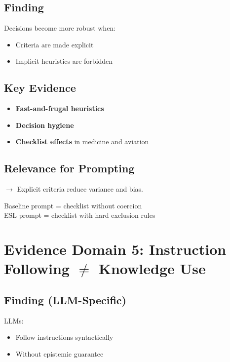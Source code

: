 \documentclass[11pt,a4paper]{article}
\begin{document}
\subsection{Finding}

Decisions become more robust when:
\begin{itemize}
    \item Criteria are made explicit
    \item Implicit heuristics are forbidden
\end{itemize}

\subsection{Key Evidence}

\begin{itemize}
    \item \textbf{Fast-and-frugal heuristics} \citep{gigerenzer1999simple}
    \item \textbf{Decision hygiene} \citep{kahneman2021noise}
    \item \textbf{Checklist effects} in medicine and aviation
\end{itemize}

\subsection{Relevance for Prompting}

$\rightarrow$ Explicit criteria reduce variance and bias.

\begin{keypoint}
Baseline prompt = checklist without coercion\\
ESL prompt = checklist with hard exclusion rules
\end{keypoint}


\section{Evidence Domain 5: Instruction Following $\neq$ Knowledge Use}

\subsection{Finding (LLM-Specific)}

LLMs:
\begin{itemize}
    \item Follow instructions syntactically
    \item Without epistemic guarantee
\end{itemize}
\end{document}
